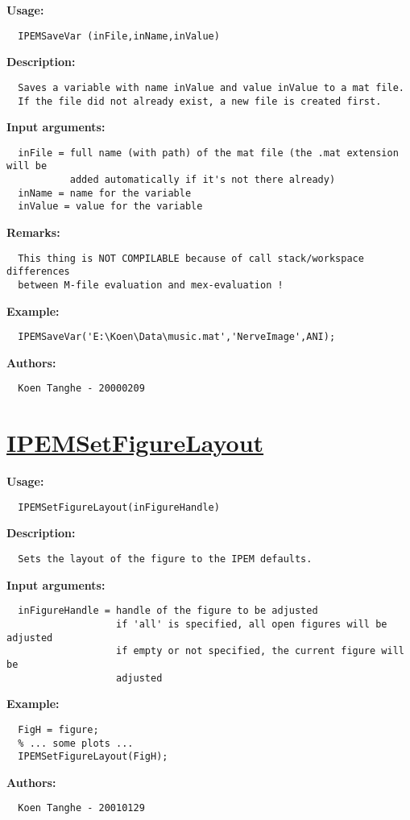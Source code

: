 \textbf{Usage:}
\begin{verbatim}  IPEMSaveVar (inFile,inName,inValue)

\end{verbatim}
\textbf{Description:}
\begin{verbatim}  Saves a variable with name inValue and value inValue to a mat file.
  If the file did not already exist, a new file is created first.

\end{verbatim}
\textbf{Input arguments:}
\begin{verbatim}  inFile = full name (with path) of the mat file (the .mat extension will be
           added automatically if it's not there already)
  inName = name for the variable
  inValue = value for the variable

\end{verbatim}
\textbf{Remarks:}
\begin{verbatim}  This thing is NOT COMPILABLE because of call stack/workspace differences
  between M-file evaluation and mex-evaluation !

\end{verbatim}
\textbf{Example:}
\begin{verbatim}  IPEMSaveVar('E:\Koen\Data\music.mat','NerveImage',ANI);

\end{verbatim}
\textbf{Authors:}
\begin{verbatim}  Koen Tanghe - 20000209
\end{verbatim}


\newpage
\section*{\hyperlink{Concepts:IPEMSetFigureLayout}{IPEMSetFigureLayout}}
\hypertarget{FuncRef:IPEMSetFigureLayout}{}

\textbf{Usage:}
\begin{verbatim}  IPEMSetFigureLayout(inFigureHandle)

\end{verbatim}
\textbf{Description:}
\begin{verbatim}  Sets the layout of the figure to the IPEM defaults.

\end{verbatim}
\textbf{Input arguments:}
\begin{verbatim}  inFigureHandle = handle of the figure to be adjusted
                   if 'all' is specified, all open figures will be adjusted
                   if empty or not specified, the current figure will be
                   adjusted

\end{verbatim}
\textbf{Example:}
\begin{verbatim}  FigH = figure;
  % ... some plots ...
  IPEMSetFigureLayout(FigH);

\end{verbatim}
\textbf{Authors:}
\begin{verbatim}  Koen Tanghe - 20010129
\end{verbatim}


